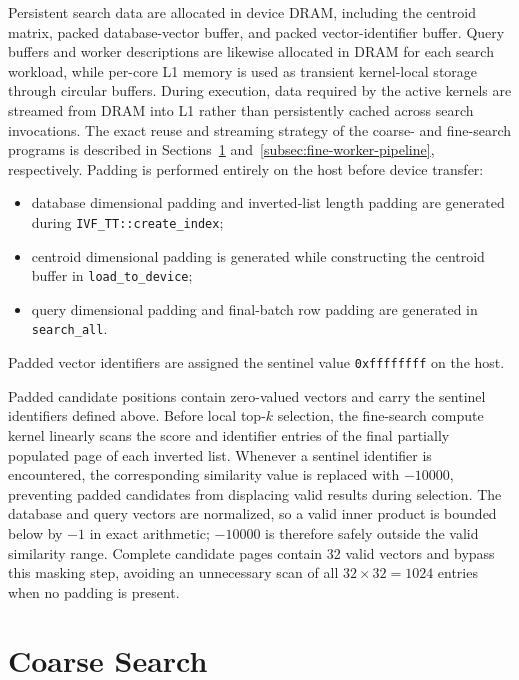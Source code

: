 Persistent search data are allocated in device DRAM, including the centroid matrix, packed database-vector buffer, and packed vector-identifier buffer. Query buffers and worker descriptions are likewise allocated in DRAM for each search workload, while per-core L1 memory is used as transient kernel-local storage through circular buffers. During execution, data required by the active kernels are streamed from DRAM into L1 rather than persistently cached across search invocations. The exact reuse and streaming strategy of the coarse- and fine-search programs is described in Sections~\ref{sec:coarse-search} and~\ref{subsec:fine-worker-pipeline}, respectively.
\newline
Padding is performed entirely on the host before device transfer:
\begin{itemize}
    \item database dimensional padding and inverted-list length padding are generated during \texttt{IVF\_TT::create\_index};
    \item centroid dimensional padding is generated while constructing the centroid buffer in \texttt{load\_to\_device};
    \item query dimensional padding and final-batch row padding are generated in \texttt{search\_all}.
\end{itemize}
Padded vector identifiers are assigned the sentinel value \texttt{0xffffffff} on the host.

Padded candidate positions contain zero-valued vectors and carry the sentinel identifiers defined above. Before local top-\(k\) selection, the fine-search compute kernel linearly scans the score and identifier entries of the final partially populated page of each inverted list. Whenever a sentinel identifier is encountered, the corresponding similarity value is replaced with \(-10000\), preventing padded candidates from displacing valid results during selection. The database and query vectors are normalized, so a valid inner product is bounded below by \(-1\) in exact arithmetic; \(-10000\) is therefore safely outside the valid similarity range. Complete candidate pages contain 32 valid vectors and bypass this masking step, avoiding an unnecessary scan of all \(32\times32=1024\) entries when no padding is present.

\section{Coarse Search}
\label{sec:coarse-search}

